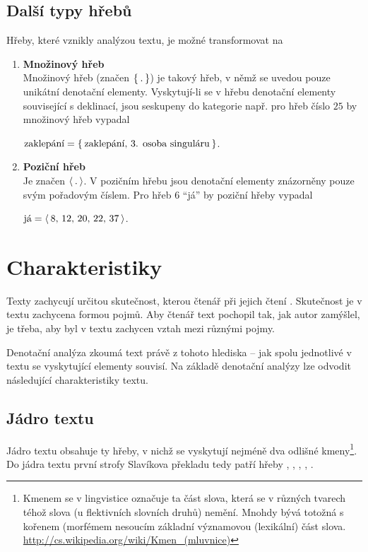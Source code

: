 \documentclass[dp.tex]{subfiles}
\begin{document}
\subsection{Další typy hřebů}
Hřeby, které vznikly analýzou textu, je možné transformovat na
\begin{enumerate}
\item \textbf{Množinový hřeb}\\
Množinový hřeb (značen $\{\kern 2pt.\kern 2pt\}$) je takový hřeb, v němž se uvedou pouze unikátní denotační elementy. Vyskytují-li se v hřebu denotační elementy související s deklinací, jsou seskupeny do kategorie např. pro hřeb číslo $25$ by množinový hřeb vypadal

$\text{zaklepání} = \{\kern 2pt \text{zaklepání, 3. osoba singuláru} \kern 2pt\}$.

\item \textbf{Poziční hřeb}\\
Je značen $\langle \kern 2pt.\kern 2pt\rangle$. V pozičním hřebu jsou denotační elementy znázorněny pouze svým pořadovým číslem. Pro hřeb 6 \enquote{já} by poziční hřeby vypadal

$\text{já} = \langle \kern 2pt \text{8, 12, 20, 22, 37} \kern 2pt\rangle$.
\end{enumerate}

\section{Charakteristiky}

Texty zachycují určitou skutečnost, kterou čtenář při jejich čtení . Skutečnost je v textu zachycena formou pojmů. Aby čtenář text pochopil tak, jak autor zamýšlel, je třeba, aby byl v textu zachycen vztah mezi různými pojmy.

Denotační analýza zkoumá text právě z tohoto hlediska -- jak spolu jednotlivé v textu se vyskytující elementy souvisí. Na základě denotační analýzy lze odvodit následující charakteristiky textu.

\subsection{Jádro textu}
Jádro textu obsahuje ty hřeby, v nichž se vyskytují nejméně dva odlišné kmeny\footnote{Kmenem se v lingvistice označuje ta část slova, která se v různých tvarech téhož slova (u flektivních slovních druhů) nemění. Mnohdy bývá totožná s kořenem (morfémem nesoucím základní významovou (lexikální) část slova. \url{http://cs.wikipedia.org/wiki/Kmen_(mluvnice)} }. Do jádra textu první strofy Slavíkova překladu tedy patří hřeby , , , , .
\end{document}
